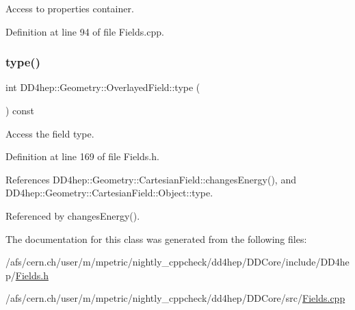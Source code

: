 Access to properties container. 



Definition at line 94 of file Fields.\+cpp.

\hypertarget{class_d_d4hep_1_1_geometry_1_1_overlayed_field_a4bd3b492dbac69a46a7a695abbbd65de}{}\label{class_d_d4hep_1_1_geometry_1_1_overlayed_field_a4bd3b492dbac69a46a7a695abbbd65de} 
\subsubsection{\texorpdfstring{type()}{type()}}
{\footnotesize\ttfamily int D\+D4hep\+::\+Geometry\+::\+Overlayed\+Field\+::type (\begin{DoxyParamCaption}{ }\end{DoxyParamCaption}) const\hspace{0.3cm}{\ttfamily [inline]}}



Access the field type. 



Definition at line 169 of file Fields.\+h.



References D\+D4hep\+::\+Geometry\+::\+Cartesian\+Field\+::changes\+Energy(), and D\+D4hep\+::\+Geometry\+::\+Cartesian\+Field\+::\+Object\+::type.



Referenced by changes\+Energy().



The documentation for this class was generated from the following files\+:\begin{DoxyCompactItemize}
\item 
/afs/cern.\+ch/user/m/mpetric/nightly\+\_\+cppcheck/dd4hep/\+D\+D\+Core/include/\+D\+D4hep/\hyperlink{_fields_8h}{Fields.\+h}\item 
/afs/cern.\+ch/user/m/mpetric/nightly\+\_\+cppcheck/dd4hep/\+D\+D\+Core/src/\hyperlink{_fields_8cpp}{Fields.\+cpp}\end{DoxyCompactItemize}
